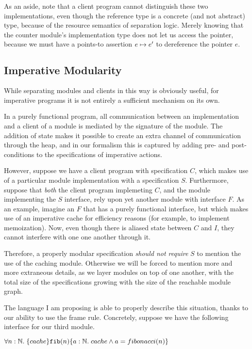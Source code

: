 As an aside, note that a client program cannot distinguish these two
implementations, even though the reference type is a concrete (and not
abstract) type, because of the resource semantics of separation
logic. Merely knowing that the counter module's implementation type
does not let us access the pointer, because we must have a points-to
assertion $e \mapsto e'$ to dereference the pointer $e$. 

\subsection{Imperative Modularity}

While separating modules and clients in this way is obviously useful,
for imperative programs it is not entirely a sufficient mechanism on
its own.

In a purely functional program, all communication between an
implementation and a client of a module is mediated by the signature
of the module. The addition of state makes it possible to create an
extra channel of communication through the heap, and in our formalism
this is captured by adding pre- and post-conditions to the
specifications of imperative actions.

However, suppose we have a client program with specification $C$,
which makes use of a particular module implementation with a
specification $S$. Furthermore, suppose that \emph{both} the client
program implemeting $C$, and the module implementing the $S$
interface, rely upon yet another module with interface $F$. As an
example, imagine an $F$ that has a purely functional interface, but
which makes use of an imperative cache for efficiency reasons (for
example, to implement memoization). Now, even though there is aliased
state between $C$ and $I$, they cannot interfere with one one another
through it.

Therefore, a properly modular specification \emph{should not require}
$S$ to mention the use of the caching module. Otherwise we will be
forced to mention more and more extraneous details, as we layer
modules on top of one another, with the total size of the
specifications growing with the size of the reachable module graph.

The language I am proposing is able to properly describe this
situation, thanks to our ability to use the frame rule. Concretely,
suppose we have the following interface for our third module.

\begin{tabbing}
$\forall n:\mathbb{N}.\; \{{cache}\}{\mathtt{fib}(n)}\{{a:\mathbb{N}}.\;{cache \land a = fibonacci(n)}\}$ \\
\end{tabbing} 

